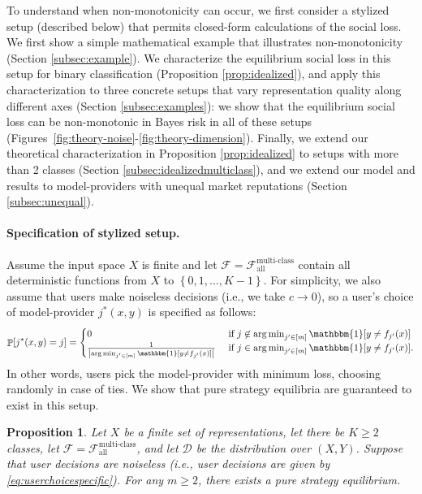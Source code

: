 \documentclass[letterpaper,11pt]{article}
\newtheorem{proposition}{Proposition}
\theoremstyle{plain}
\DeclareMathOperator*{\argmin}{arg\,min}
\DeclareMathOperator*{\Prob}{\mathbb{P}}
\begin{document}
To understand when non-monotonicity can occur, we first consider a stylized setup (described below) that permits closed-form calculations of the social loss. We first show a simple mathematical example that illustrates non-monotonicity (Section \ref{subsec:example}). We characterize the equilibrium social loss in this setup for binary classification (Proposition \ref{prop:idealized}), and apply this characterization to three concrete setups that vary representation quality along different axes (Section \ref{subsec:examples}): we show that the equilibrium social loss can be non-monotonic in Bayes risk in all of these setups (Figures~\ref{fig:theory-noise}-\ref{fig:theory-dimension}). Finally, we extend our theoretical characterization in Proposition \ref{prop:idealized} to setups with more than 2 classes (Section \ref{subsec:idealizedmulticlass}), and we extend our model and results to model-providers with unequal market reputations (Section \ref{subsec:unequal}).

\paragraph{Specification of stylized setup.} Assume the input space $X$ is finite and let $\mathcal{F} = \mathcal{F}^{\text{multi-class}}_{\text{all}}$ contain {all deterministic functions} from $X$ to $\left\{0,1, \ldots, K-1\right\}$. For simplicity, we also assume that users make noiseless decisions (i.e., we take $c \rightarrow 0$), so a user's choice of model-provider $j^*(x,y)$ is specified as follows: 
\begin{equation}
    \label{eq:userchoicespecific}
    \Prob[j^*(x,y) = j] = 
\begin{cases}
0 & \text{ if } j \not\in \argmin_{j' \in [m]} \mathbbm{1}[y \neq f_{j'}(x)] \\
\frac{1}{\left|\argmin_{j' \in [m]} \mathbbm{1}[y \neq f_{j'}(x)] \right|}
& \text{ if } j \in \argmin_{j' \in [m]} \mathbbm{1}[y \neq f_{j'}(x)].
\end{cases}
\end{equation}
In other words, users pick the model-provider with minimum loss, choosing randomly in case of ties. We show that pure strategy equilibria are guaranteed to exist in this setup. 
\begin{proposition}
\label{prop:existence}
Let $X$ be a finite set of representations, let there be $K \ge 2$ classes, let $\mathcal{F} = \mathcal{F}^{\text{multi-class}}_{\text{all}}$, and let $\mathcal{D}$ be the distribution over $(X,Y)$. Suppose that user decisions are noiseless (i.e., user decisions are given by \eqref{eq:userchoicespecific}). For any $m \ge 2$, there exists a pure strategy equilibrium. 
\end{proposition}
\end{document}
